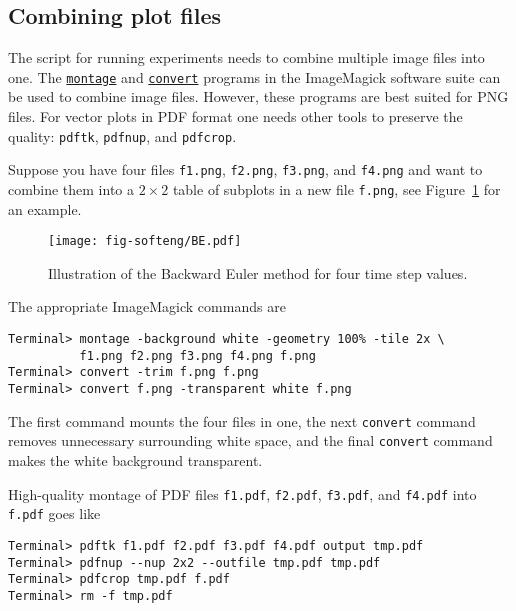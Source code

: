 \documentclass[graybox,sectrefs,envcountresetchap,open=right,final]{svmonodo}
\begin{document}
\subsection{Combining plot files}

The script for running experiments needs to combine multiple image
files into one. The
\href{{http://www.imagemagick.org/script/montage.php}}{\nolinkurl{montage}}
and
\href{{http://www.imagemagick.org/script/convert.php}}{\nolinkurl{convert}} programs in
the ImageMagick software suite
can be used to combine image files.
However, these programs are best suited for
PNG files. For vector plots in PDF format one needs other tools
to preserve the quality: \texttt{pdftk}, \texttt{pdfnup}, and \texttt{pdfcrop}.

Suppose you have four files \texttt{f1.png}, \texttt{f2.png}, \texttt{f3.png}, and \texttt{f4.png}
and want to combine them into a $2\times 2$ table of subplots in a new
file \texttt{f.png}, see
Figure~\ref{softeng1:experiments:fig:BE4a} for an example.


\begin{figure}[!ht]  %
  \centerline{\texttt{[image: fig-softeng/BE.pdf]}}
  \caption{
  Illustration of the Backward Euler method for four time step values. \label{softeng1:experiments:fig:BE4a}
  }
\end{figure}


The appropriate ImageMagick commands are

\begin{Verbatim}[frame=lines,label=\fbox{{\tiny Terminal}},framesep=2.5mm,framerule=0.7pt,fontsize=\fontsize{9pt}{9pt}]
Terminal> montage -background white -geometry 100% -tile 2x \ 
          f1.png f2.png f3.png f4.png f.png
Terminal> convert -trim f.png f.png
Terminal> convert f.png -transparent white f.png
\end{Verbatim}
The first command mounts the four files in one, the next \texttt{convert} command
removes unnecessary surrounding white space, and the final \texttt{convert} command
makes the white background transparent.

High-quality montage of PDF files \texttt{f1.pdf},
\texttt{f2.pdf}, \texttt{f3.pdf}, and \texttt{f4.pdf} into \texttt{f.pdf} goes like

\begin{Verbatim}[frame=lines,label=\fbox{{\tiny Terminal}},framesep=2.5mm,framerule=0.7pt,fontsize=\fontsize{9pt}{9pt}]
Terminal> pdftk f1.pdf f2.pdf f3.pdf f4.pdf output tmp.pdf
Terminal> pdfnup --nup 2x2 --outfile tmp.pdf tmp.pdf
Terminal> pdfcrop tmp.pdf f.pdf
Terminal> rm -f tmp.pdf
\end{Verbatim}
\end{document}
